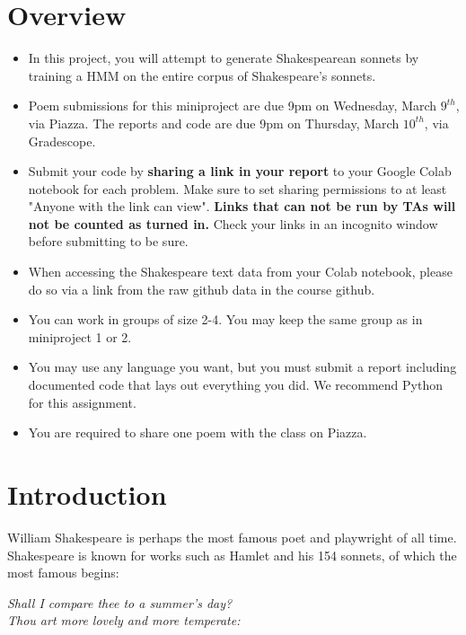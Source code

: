 



\pagestyle{fancy}
\section{Overview}
\begin{itemize}
\item In this project, you will attempt to generate Shakespearean sonnets by training a HMM on the entire corpus of Shakespeare's sonnets.

\item Poem submissions for this miniproject are due 9pm on Wednesday, March $9^{th}$, via Piazza. The reports and code are due 9pm on Thursday, March $10^{th}$, via Gradescope.

\item Submit your code by \textbf{sharing a link in your report} to your Google Colab notebook for each problem. Make sure to set sharing permissions to at least "Anyone with the link can view". \textbf{Links that can not be run by TAs will not be counted as turned in.} Check your links in an incognito window before submitting to be sure.

\item When accessing the Shakespeare text data from your Colab notebook, please do so via a link from the raw github data in the course github.

\item You can work in groups of size 2-4.  You may keep the same group as in miniproject 1 or 2.

\item You may use any language you want, but you must submit a report including documented code that lays out everything you did. We recommend Python for this assignment.

\item You are required to share one poem with the class on Piazza.

\end{itemize}

\section{Introduction}
William Shakespeare is perhaps the most famous poet and playwright of all time. Shakespeare is known for works such as Hamlet and his 154 sonnets, of which the most famous begins:
\begin{center}\emph{Shall I compare thee to a summer's day?\\
Thou art more lovely and more temperate:}\end{center}


